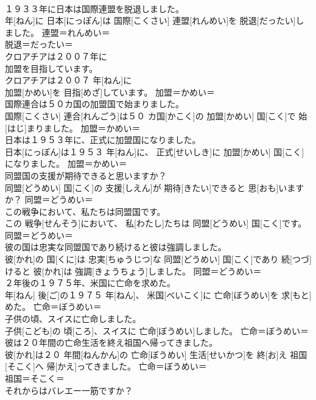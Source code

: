 \documentclass[8pt]{extreport}
\begin{document}
\begin{CJK}{UTF8}{min}
\\	１９３３年に日本は国際連盟を脱退しました。	
\\	年[ねん]に 日本[にっぽん]は 国際[こくさい] 連盟[れんめい]を 脱退[だったい]しました。	連盟＝れんめい＝ 
\\	脱退＝だったい＝ 
\\	クロアチアは２００７年に
\\	加盟を目指しています。	
\\	クロアチアは２００７ 年[ねん]に 
\\	加盟[かめい]を 目指[めざ]しています。	加盟＝かめい＝ 
\\	国際連合は５０カ国の加盟国で始まりました。	
\\	国際[こくさい] 連合[れんごう]は５０ カ国[かこく]の 加盟[かめい] 国[こく]で 始[はじ]まりました。	加盟＝かめい＝ 
\\	日本は１９５３年に、正式に加盟国になりました。	
\\	日本[にっぽん]は１９５３ 年[ねん]に、 正式[せいしき]に 加盟[かめい] 国[こく]になりました。	加盟＝かめい＝ 
\\	同盟国の支援が期待できると思いますか？	
\\	同盟[どうめい] 国[こく]の 支援[しえん]が 期待[きたい]できると 思[おも]いますか？	同盟＝どうめい＝ 
\\	この戦争において、私たちは同盟国です。	
\\	この 戦争[せんそう]において、 私[わたし]たちは 同盟[どうめい] 国[こく]です。	同盟＝どうめい＝ 
\\	彼の国は忠実な同盟国であり続けると彼は強調しました。	
\\	彼[かれ]の 国[くに]は 忠実[ちゅうじつ]な 同盟[どうめい] 国[こく]であり 続[つづ]けると 彼[かれ]は 強調[きょうちょう]しました。	同盟＝どうめい＝ 
\\	２年後の１９７５年、米国に亡命を求めた。	
\\	年[ねん] 後[ご]の１９７５ 年[ねん]、 米国[べいこく]に 亡命[ぼうめい]を 求[もと]めた。	亡命＝ぼうめい＝ 
\\	子供の頃、スイスに亡命しました。	
\\	子供[こども]の 頃[ころ]、スイスに 亡命[ぼうめい]しました。	亡命＝ぼうめい＝ 
\\	彼は２０年間の亡命生活を終え祖国へ帰ってきました。	
\\	彼[かれ]は２０ 年間[ねんかん]の 亡命[ぼうめい] 生活[せいかつ]を 終[お]え 祖国[そこく]へ 帰[かえ]ってきました。	亡命＝ぼうめい＝ 
\\	祖国＝そこく＝ 
\\	それからはバレエー一筋ですか？	

\end{CJK}
\end{document}
